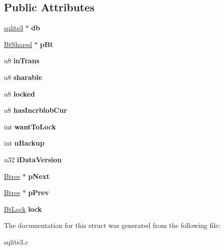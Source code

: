 \subsection*{Public Attributes}
\begin{DoxyCompactItemize}
\item 
\hyperlink{structsqlite3}{sqlite3} $\ast$ {\bfseries db}\hypertarget{structBtree_a2b3cfec48b6e9fcfd641d433816ae5c3}{}\label{structBtree_a2b3cfec48b6e9fcfd641d433816ae5c3}

\item 
\hyperlink{structBtShared}{Bt\+Shared} $\ast$ {\bfseries p\+Bt}\hypertarget{structBtree_a63bab5d744d48d14368af048dddf2f20}{}\label{structBtree_a63bab5d744d48d14368af048dddf2f20}

\item 
u8 {\bfseries in\+Trans}\hypertarget{structBtree_a50007448960c05dfd1fdc7db3e277685}{}\label{structBtree_a50007448960c05dfd1fdc7db3e277685}

\item 
u8 {\bfseries sharable}\hypertarget{structBtree_a114f157127c76a1fbad8292e4b39c4dd}{}\label{structBtree_a114f157127c76a1fbad8292e4b39c4dd}

\item 
u8 {\bfseries locked}\hypertarget{structBtree_a16fc8292bae9a66cfec03f6cb82d06a8}{}\label{structBtree_a16fc8292bae9a66cfec03f6cb82d06a8}

\item 
u8 {\bfseries has\+Incrblob\+Cur}\hypertarget{structBtree_a247c6bd4123c5d53ebb96bd879047e25}{}\label{structBtree_a247c6bd4123c5d53ebb96bd879047e25}

\item 
int {\bfseries want\+To\+Lock}\hypertarget{structBtree_a97368ea300f0b74b8e80ea07da0cea2a}{}\label{structBtree_a97368ea300f0b74b8e80ea07da0cea2a}

\item 
int {\bfseries n\+Backup}\hypertarget{structBtree_a7a3e7cf38bc9c3021a9e270a54ecfb1e}{}\label{structBtree_a7a3e7cf38bc9c3021a9e270a54ecfb1e}

\item 
u32 {\bfseries i\+Data\+Version}\hypertarget{structBtree_a333e24a5c4340e94bad7aa13aa36ae31}{}\label{structBtree_a333e24a5c4340e94bad7aa13aa36ae31}

\item 
\hyperlink{structBtree}{Btree} $\ast$ {\bfseries p\+Next}\hypertarget{structBtree_a9e6d2ca44c10ed8ef0be004225a74ef5}{}\label{structBtree_a9e6d2ca44c10ed8ef0be004225a74ef5}

\item 
\hyperlink{structBtree}{Btree} $\ast$ {\bfseries p\+Prev}\hypertarget{structBtree_a0423f1c55c1fe6812161a49bb2bf604f}{}\label{structBtree_a0423f1c55c1fe6812161a49bb2bf604f}

\item 
\hyperlink{structBtLock}{Bt\+Lock} {\bfseries lock}\hypertarget{structBtree_a943ed8799c9943f753a88cf44f1632dc}{}\label{structBtree_a943ed8799c9943f753a88cf44f1632dc}

\end{DoxyCompactItemize}


The documentation for this struct was generated from the following file\+:\begin{DoxyCompactItemize}
\item 
sqlite3.\+c\end{DoxyCompactItemize}

